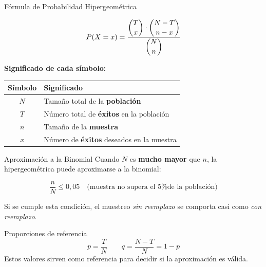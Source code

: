 \documentclass[10pt]{beamer}
\begin{document}
\begin{frame}{Fórmula de Probabilidad Hipergeométrica}
\begin{center}
\Large
\[
P(X=x) = \frac{\dbinom{T}{x} \cdot \dbinom{N-T}{n-x}}{\dbinom{N}{n}}
\]
\end{center}

\vspace{0.3cm}
\textbf{Significado de cada símbolo:}
\vspace{0.2cm}

\begin{table}
\centering
\begin{tabular}{@{}cl@{}}
\toprule
\textbf{Símbolo} & \textbf{Significado} \\
\midrule
\textcolor{celesteoscuro}{\textbf{$N$}} & Tamaño total de la \textbf{población} \\
\textcolor{celesteoscuro}{\textbf{$T$}} & Número total de \textbf{éxitos} en la población \\
\textcolor{celesteoscuro}{\textbf{$n$}} & Tamaño de la \textbf{muestra} \\
\textcolor{celesteoscuro}{\textbf{$x$}} & Número de \textbf{éxitos} deseados en la muestra \\
\bottomrule
\end{tabular}
\end{table}
\end{frame}

\begin{frame}{Aproximación a la Binomial}
\justifying
Cuando $N$ es \textbf{mucho mayor} que $n$, la hipergeométrica puede aproximarse a la binomial:

\vspace{0.3cm}
\begin{center}
\Large
\[
\frac{n}{N} \leq 0,05 \quad \text{(muestra no supera el 5\% de la población)}
\]
\end{center}

\vspace{0.2cm}
\justifying
Si se cumple esta condición, el muestreo \textit{sin reemplazo} se comporta casi como \textit{con reemplazo}.

\vspace{0.2cm}
\begin{exampleblock}{Proporciones de referencia}
\[
p = \frac{T}{N} \qquad q = \frac{N-T}{N} = 1 - p
\]
Estos valores sirven como referencia para decidir si la aproximación es válida.
\end{exampleblock}
\end{frame}
\end{document}
